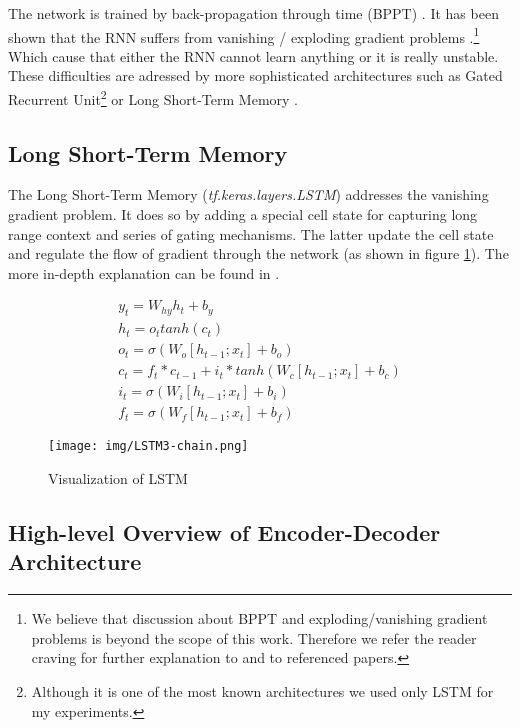 The network is trained by back-propagation through time (BPPT) \citep{bpptWerbos1990}. It has been shown that the RNN suffers from vanishing / exploding gradient problems \citep{hochreiter1997}.\footnote{We believe that discussion about BPPT and exploding/vanishing gradient problems is beyond the scope of this work. Therefore we refer the reader craving for further explanation to \citep{Goodfellow-et-al-2016} and to referenced papers.} Which cause that either the RNN cannot learn anything or it is really unstable. These difficulties are adressed by more sophisticated architectures such as Gated Recurrent Unit\footnote{Although it is one of the most known architectures we used only LSTM for my experiments. } \citep{cho2014learning} or Long Short-Term Memory \citep{hochreiter1997}.


\subsection{Long Short-Term Memory}

The Long Short-Term Memory (\emph{tf.ke\-ras.lay\-ers.LSTM}) addresses the vanishing gradient problem. It does so by adding a special cell state for capturing long range context and series of gating mechanisms. The latter update the cell state and regulate the flow of gradient through the network (as shown in figure \ref{figure:visualization_lstm}). The more in-depth explanation can be found in \citep{Olah2015}.

\begin{figure}[!ht]
    \begin{gather}
        y_t = W_{hy}h_t + b_y \\
        h_t = o_t tanh(c_t) \\
        o_t = \sigma(W_o[h_{t-1};x_t] + b_o) \\
        c_t = f_t * c_{t-1} + i_t * tanh(W_c[h_{t-1}; x_t] + b_c)\\
        i_t = \sigma(W_i[h_{t-1}; x_t] + b_i)\\
        f_t = \sigma(W_f[h_{t-1}; x_t] + b_f)
    \end{gather}
\end{figure}
\begin{figure}[!ht]
    \centering
    \texttt{[image: img/LSTM3-chain.png]}
    \caption{Visualization of LSTM \citep{Olah2015}} \label{figure:visualization_lstm}
\end{figure}

\subsection{High-level Overview of Encoder-Decoder Architecture} \label{subsection:high_level_encoder_decoder}

